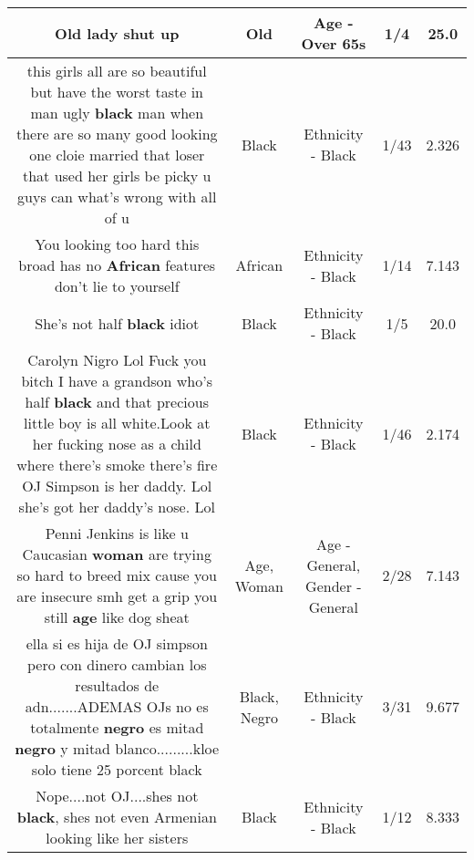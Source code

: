 \documentclass[11pt]{article}
\newlength\mylength
\begin{document}
\begin{center}
\begin{longtable}{|C{.65\mylength}|C{.30\mylength}|C{.12\mylength}|C{.12\mylength}|C{.12\mylength}|}
  \small Old lady shut up\normalsize   & Old & Age - Over 65s & 1/4 & 25.0 \\  \hline
  \small this girls all are so beautiful but have the worst taste in man ugly \textbf{black} man when there are so many good looking one cloie married that loser that used her girls be picky u guys can what's wrong with all of u\normalsize   & Black & Ethnicity - Black & 1/43 & 2.326 \\  \hline
  \small You looking too hard this broad has no \textbf{African} features don't lie to yourself\normalsize   & African & Ethnicity - Black & 1/14 & 7.143 \\  \hline
  \small She's not half \textbf{black} idiot\normalsize   & Black & Ethnicity - Black & 1/5 & 20.0 \\  \hline
  \small Carolyn Nigro Lol Fuck you bitch I have a grandson who's half \textbf{black} and that precious little boy is all white.Look at her fucking nose as a child where there's smoke there's fire OJ Simpson is her daddy. Lol she's got her daddy's nose. Lol\normalsize   & Black & Ethnicity - Black & 1/46 & 2.174 \\  \hline
  \small Penni Jenkins is like u Caucasian \textbf{woman} are trying so hard to breed mix cause you are insecure smh get a grip you still \textbf{age} like dog sheat\normalsize   & Age, Woman & Age - General, Gender - General & 2/28 & 7.143 \\  \hline
  \small ella si es hija de OJ simpson pero con dinero cambian los resultados de adn.......ADEMAS  OJs no es totalmente \textbf{negro} es mitad \textbf{negro} y mitad blanco.........kloe solo tiene 25 porcent black\normalsize   & Black, Negro & Ethnicity - Black & 3/31 & 9.677 \\  \hline
  \small Nope....not OJ....shes not \textbf{black}, shes not even Armenian looking like her sisters\normalsize   & Black & Ethnicity - Black & 1/12 & 8.333 \\  \hline

\end{longtable}
\end{center}
\end{document}
